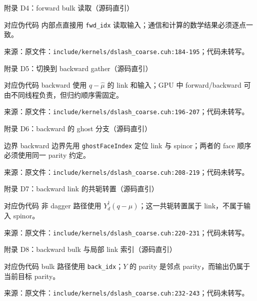 \documentclass[UTF8,aspectratio=169,11pt]{ctexbeamer}
\newcommand{\source}[1]{\vspace{0.05em}\par{\raggedright\scriptsize\color{muted}来源：#1\par}}
\newcommand{\codepath}[1]{\nolinkurl{#1}}
\begin{document}
\begin{frame}[fragile,t]{附录 D4：forward bulk 读取（源码直引）}
  
  \begin{block}{对应伪代码}
    内部点直接用 \texttt{fwd\_idx} 读取输入；通信和计算的数学结果必须逐点一致。
  \end{block}
  \source{原文件：\codepath{include/kernels/dslash_coarse.cuh:184-195}；代码未转写。}
\end{frame}

\begin{frame}[fragile,t]{附录 D5：切换到 backward gather（源码直引）}
  
  \begin{block}{对应伪代码}
    backward 使用 \(q-\hat\mu\) 的 link 和输入；GPU 中 forward/backward 可由不同线程负责，但归约顺序需固定。
  \end{block}
  \source{原文件：\codepath{include/kernels/dslash_coarse.cuh:196-207}；代码未转写。}
\end{frame}

\begin{frame}[fragile,t]{附录 D6：backward 的 ghost 分支（源码直引）}
  
  \begin{alertblock}{边界}
    backward 边界先用 \texttt{ghostFaceIndex} 定位 link 与 spinor；两者的 face 顺序必须使用同一 parity 约定。
  \end{alertblock}
  \source{原文件：\codepath{include/kernels/dslash_coarse.cuh:208-219}；代码未转写。}
\end{frame}

\begin{frame}[fragile,t]{附录 D7：backward link 的共轭转置（源码直引）}
  
  \begin{block}{对应伪代码}
    非 dagger 路径使用 \(Y_d^\dagger(q-\hat\mu)\)；这一共轭转置属于 link，不属于输入 spinor。
  \end{block}
  \source{原文件：\codepath{include/kernels/dslash_coarse.cuh:220-231}；代码未转写。}
\end{frame}

\begin{frame}[fragile,t]{附录 D8：backward bulk 与局部 link 索引（源码直引）}
  
  \begin{block}{对应伪代码}
    bulk 路径使用 \texttt{back\_idx}；\(Y\) 的 parity 是邻点 parity，而输出仍属于当前目标 parity。
  \end{block}
  \source{原文件：\codepath{include/kernels/dslash_coarse.cuh:232-243}；代码未转写。}
\end{frame}
\end{document}
